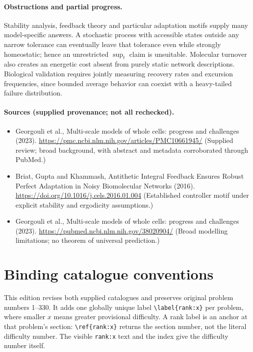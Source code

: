 \documentclass[11pt]{article}
\begin{document}
\paragraph{Obstructions and partial progress.} Stability analysis, feedback theory and particular adaptation motifs supply many model-specific answers. A stochastic process with accessible states outside any narrow tolerance can eventually leave that tolerance even while strongly homeostatic; hence an unrestricted $\sup_t$ claim is unsuitable. Molecular turnover also creates an energetic cost absent from purely static network descriptions. Biological validation requires jointly measuring recovery rates and excursion frequencies, since bounded average behavior can coexist with a heavy-tailed failure distribution.
\paragraph{Sources (supplied provenance; not all rechecked).}
\begin{itemize}
\item Georgouli et al., Multi-scale models of whole cells: progress and challenges (2023). \url{https://pmc.ncbi.nlm.nih.gov/articles/PMC10661945/} (Supplied review; broad background, with abstract and metadata corroborated through PubMed.)
\item Briat, Gupta and Khammash, Antithetic Integral Feedback Ensures Robust Perfect Adaptation in Noisy Biomolecular Networks (2016). \url{https://doi.org/10.1016/j.cels.2016.01.004} (Established controller motif under explicit stability and ergodicity assumptions.)
\item Georgouli et al., Multi-scale models of whole cells: progress and challenges (2023). \url{https://pubmed.ncbi.nlm.nih.gov/38020904/} (Broad modelling limitations; no theorem of universal prediction.)
\end{itemize}


\section*{Binding catalogue conventions}
This edition revises both supplied catalogues and preserves original problem numbers 1--330. It adds one globally unique label \verb|\label{rank:x}| per problem, where smaller $x$ means greater provisional difficulty. A rank label is an anchor at that problem's section: \verb|\ref{rank:x}| returns the section number, not the literal difficulty number. The visible \texttt{rank:x} text and the index give the difficulty number itself.
\end{document}
